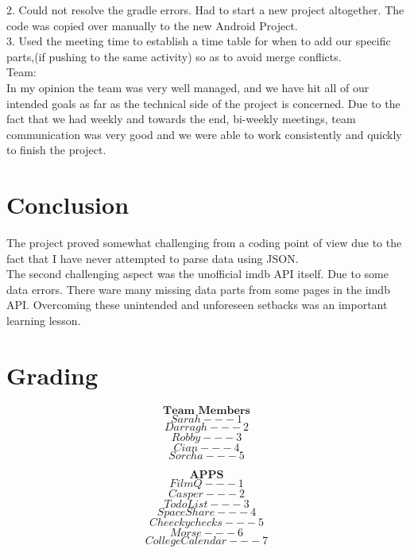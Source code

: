 \documentclass{article}
\begin{document}
\begin{flushleft}
2. Could not resolve the gradle errors. Had to start a new project altogether. The code was copied over manually to the new Android Project.\\
3. Used the meeting time to establish a time table for when to add our specific parts,(if pushing to the same activity)  so as to avoid merge conflicts.\\
Team:\\
In my opinion the team was very well managed, and we have hit all of our intended goals as far as the technical side of the project is concerned. Due to the fact that we had weekly and towards the end, bi-weekly meetings, team communication was very good and we were able to work consistently and quickly to finish the project.\\

\end{flushleft}



\section{Conclusion}
The project proved somewhat challenging from a coding point of view due to the fact that I have never attempted to parse data using JSON.\\
The second challenging aspect was the unofficial imdb API itself. Due to some data errors. There ware many missing data parts from some pages in the imdb API. Overcoming these unintended and unforeseen setbacks was an important learning lesson.

\pagebreak

\section{Grading}
$$\textbf{Team Members}$$
$$Sarah ---1$$
$$Darragh ---2$$
$$Robby ---3$$
$$Cian ---4$$
$$Sorcha ---5$$

$$\textbf{APPS}$$
$$FilmQ ---1$$
$$Casper ---2$$
$$To do List ---3$$
$$SpaceShare ---4$$
$$Cheecky checks ---5$$
$$Morse ---6$$
$$College Calendar ---7$$
\end{document}
